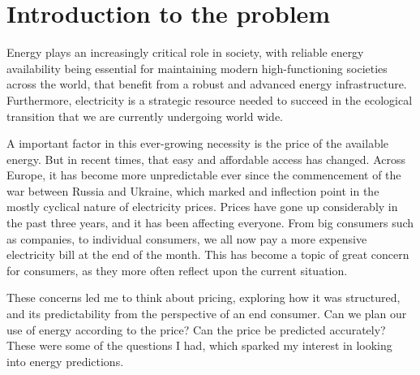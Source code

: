 \documentclass[12pt]{report} %
\begin{document}
\clearpage
{} %





\chapter{Introduction to the problem}

Energy plays an increasingly critical role in society, with reliable energy availability being essential for maintaining modern high-functioning societies across the world, that benefit from a robust and advanced energy infrastructure. Furthermore, electricity is a strategic resource needed to succeed in the ecological transition that we are currently undergoing world wide.


A important factor in this ever-growing necessity is the price of the available energy. But in recent times, that easy and affordable access has changed. Across Europe, it has become more unpredictable ever since the commencement of the war between Russia and Ukraine, which marked and inflection point in the mostly cyclical nature of electricity prices. Prices have gone up considerably in the past three years, and it has been affecting everyone. From big consumers such as companies, to individual consumers, we all now pay a more expensive electricity bill at the end of the month. This has become a topic of great concern for consumers, as they more often reflect upon the current situation.

These concerns led me to think about pricing, exploring how it was structured, and its predictability from the perspective of an end consumer. Can we plan our use of energy according to the price? Can the price be predicted accurately? These were some of the questions I had, which sparked my interest in looking into energy predictions.
\end{document}
